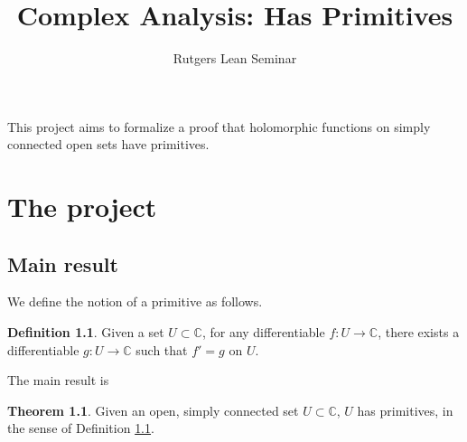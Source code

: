 \documentclass{report}
\title{Complex Analysis: Has Primitives}
\author{Rutgers Lean Seminar}
\theoremstyle{definition}
\newtheorem{definition}{Definition}
\newtheorem{theorem}{Theorem}
\begin{document}
\maketitle

This project aims to formalize a proof that holomorphic functions on simply connected open sets have primitives.

\chapter{The project}

\section{Main result}

We define the notion of a primitive as follows.

\begin{definition}
  \label{def:hasPrimitives}
  \leanok
  Given a set $U\subset\mathbb C$, for any differentiable $f:U\to\mathbb C$, there exists a differentiable $g:U\to\mathbb C$ such that $f'=g$ on $U$.
\end{definition}

The main result is
\begin{theorem}
  \label{theo:hasPrimitivesOfSimplyConnected}
  \leanok
  Given an open, simply connected set $U\subset\mathbb C$, $U$ has primitives, in the sense of Definition \ref{def:hasPrimitives}.
\end{theorem}
\end{document}
